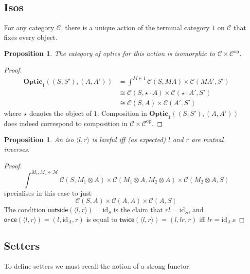 \documentclass[11pt,a4paper]{article}
\theoremstyle{plain}
\newtheorem{proposition}[theorem]{Proposition}
\theoremstyle{definition}
\newcommand{\C}{\mathscr{C}}
\newcommand{\M}{\mathscr{M}}
\newcommand{\Optic}{\mathbf{Optic}}
\newcommand{\id}{\mathrm{id}}
\newcommand{\op}{\mathrm{op}}
\newcommand{\outside}{\mathsf{outside}}
\newcommand{\once}{\mathsf{once}}
\newcommand{\twice}{\mathsf{twice}}
\begin{document}
\subsection{Isos}

For any category $\C$, there is a unique action of the terminal category $1$ on $\C$ that fixes every object. 

\begin{proposition}
The category of optics for this action is isomorphic to $\C \times \C^\op$.
\end{proposition}
\begin{proof}
\begin{align*}
\Optic_1((S, S'), (A, A')) &= \int^{M \in 1} \C(S, MA) \times \C(MA', S') \\
&\cong \C(S, \star \cdot A) \times \C(\star \cdot A', S') \\
&\cong \C(S, A) \times \C(A', S')
\end{align*}
where $\star$ denotes the object of $1$. Composition in $\Optic_1((S, S'), (A, A'))$ does indeed correspond to composition in $\C \times \C^\op$.
\end{proof}

\begin{proposition}
An iso $\langle l, r \rangle$ is lawful iff (as expected) $l$ and $r$ are mutual inverses.
\end{proposition}
\begin{proof}
\[ \int^{M_1, M_2 \in \M} \C(S, M_1 \otimes A) \times \C(M_1 \otimes A, M_2 \otimes A) \times \C(M_2 \otimes A, S) \]
specialises in this case to just
\[ \C(S, A) \times \C(A, A) \times \C(A, S) \]
The condition $\outside(\langle l, r \rangle) = \id_S$ is the claim that $rl = \id_S$, and $\once(\langle l, r \rangle) = (l, \id_A, r)$ is equal to $\twice(\langle l, r \rangle) = (l, lr, r)$ iff $lr = \id_A$.s
\end{proof}

\subsection{Setters}

To define setters we must recall the notion of a strong functor.
\end{document}
